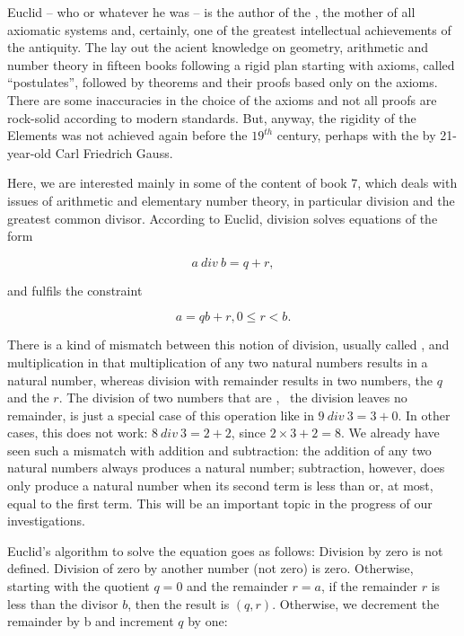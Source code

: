 \documentclass{scrreprt}
\begin{document}
Euclid -- who or whatever he was --
is the author of the ,
the mother of all axiomatic systems and,
certainly, one of the greatest 
intellectual achievements of the antiquity.
The  lay out the acient
knowledge on geometry, arithmetic and
number theory in fifteen books
following a rigid plan
starting with axioms, called ``postulates'', 
followed by theorems
and their proofs based only on the axioms.
There are some inaccuracies in the choice of the axioms
and not all proofs are rock-solid 
according to modern standards. 
But, anyway, the rigidity of the Elements
was not achieved again before
the $19^{th}$ century, perhaps with
the 
by 21-year-old Carl Friedrich Gauss.

Here, we are interested mainly in
some of the content of book 7,
which deals with issues of arithmetic and elementary number theory,
in particular division and the greatest common divisor.
According to Euclid, division solves equations of the form

\begin{equation}
  a~div~b = q + r,
\end{equation}

and fulfils the constraint

\begin{equation}
  a = qb + r, 0 \le r < b.
\end{equation}

There is a kind of mismatch between this notion of division,
usually called ,
and multiplication in that multiplication
of any two natural numbers results in a natural number,
whereas division with remainder results in two numbers,
the  $q$ and the  $r$.
The division of two numbers that are ,
\ie\ the division leaves no remainder,
is just a special case of this operation
like in $9~div~3 = 3 + 0$.
In other cases, this does not work:
$8~div~3 = 2 + 2$, since $2 \times 3 + 2 = 8$.
We already have seen such a mismatch with addition and subtraction:
the addition of any two natural numbers always produces
a natural number; subtraction, however, 
does only produce a natural number when its second term
is less than or, at most, equal to the first term.
This will be an important topic in the progress of our investigations.

Euclid's algorithm to solve the equation
goes as follows:
Division by zero is not defined.
Division of zero by another number (not zero) is zero.
Otherwise, starting with the quotient $q = 0$
and the remainder $r = a$,
if the remainder $r$ is less than 
the divisor $b$, then the result is $(q,r)$.
Otherwise, we decrement the remainder by b
and increment $q$ by one: 
\end{document}
